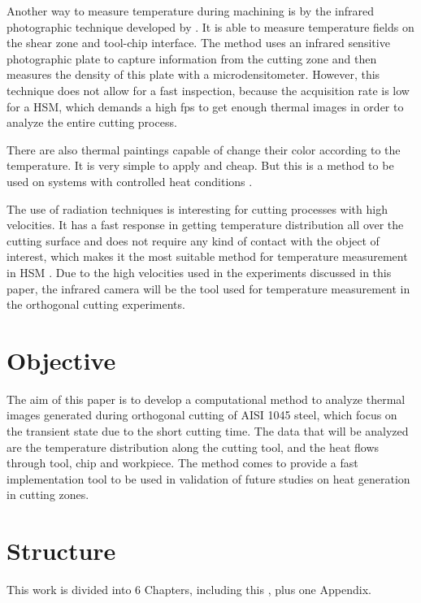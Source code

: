 	Another way to measure temperature during machining is by the infrared photographic technique developed by . It is able to measure temperature fields on the shear zone and tool-chip interface. The method uses an infrared sensitive photographic plate to capture information from the cutting zone and then measures the density of this plate with a microdensitometer.	However, this technique does not allow for a fast inspection, because the acquisition rate is low for a HSM, which demands a high fps to get enough thermal images in order to analyze the entire cutting process.

	There are also thermal paintings capable of change their color according to the temperature. It is very simple to apply and cheap. But this is a method to be used on systems with controlled heat conditions \cite{komanduri2001thermal}.

	The use of radiation techniques is interesting for cutting processes with high velocities. It has a fast response in getting temperature distribution all over the cutting surface and does not require any kind of contact with the object of interest, which makes it the most suitable method for temperature measurement in HSM \cite{abukhshim2006heat}. Due to the high velocities used in the experiments discussed in this paper, the infrared camera will be the tool used for temperature measurement in the orthogonal cutting experiments.

	
	\section{Objective}

	The aim of this paper is to develop a computational method to analyze thermal images generated during orthogonal cutting of AISI 1045 steel, which focus on the transient state due to the short cutting time. The data that will be analyzed are the temperature distribution along the cutting tool, and the heat flows through tool, chip and workpiece. The method comes to provide a fast implementation tool to be used in validation of future studies on heat generation in cutting zones.

	\section{Structure}
	
	This work is divided into 6 Chapters, including this \textbf{}, plus one Appendix.
	
